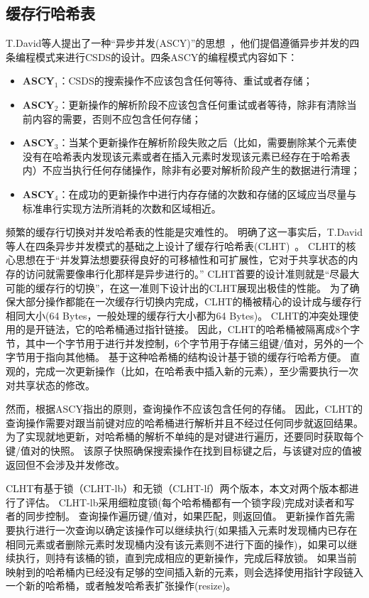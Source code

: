 \subsection{缓存行哈希表}
\label{sec:clht}

T.David等人提出了一种“异步并发(ASCY)”的思想~\cite{clht}，他们提倡遵循异步并发的四条编程模式来进行CSDS的设计。四条ASCY的编程模式内容如下：
\begin{itemize}
\item \textbf{ASCY$_1$}：CSDS的搜索操作不应该包含任何等待、重试或者存储；
\item \textbf{ASCY$_2$}：更新操作的解析阶段不应该包含任何重试或者等待，除非有清除当前内容的需要，否则不应包含任何存储；
\item \textbf{ASCY$_3$}：当某个更新操作在解析阶段失败之后（比如，需要删除某个元素使没有在哈希表内发现该元素或者在插入元素时发现该元素已经存在于哈希表内）不应当执行任何存储操作，除非有必要对解析阶段产生的数据进行清理；
\item \textbf{ASCY$_4$}：在成功的更新操作中进行内存存储的次数和存储的区域应当尽量与标准串行实现方法所消耗的次数和区域相近。
\end{itemize}

频繁的缓存行切换对并发哈希表的性能是灾难性的。
明确了这一事实后，T.David等人在四条异步并发模式的基础之上设计了缓存行哈希表(CLHT)~\cite{clht}。
CLHT的核心思想在于“并发算法想要获得良好的可移植性和可扩展性，它对于共享状态的内存的访问就需要像串行化那样是异步进行的。”
CLHT首要的设计准则就是“尽最大可能的缓存行的切换”，在这一准则下设计出的CLHT展现出极佳的性能。
为了确保大部分操作都能在一次缓存行切换内完成，CLHT的桶被精心的设计成与缓存行相同大小(64 Bytes，一般处理的缓存行大小都为64 Bytes)。
CLHT的冲突处理使用的是开链法，它的哈希桶通过指针链接。
因此，CLHT的哈希桶被隔离成8个字节，其中一个字节用于进行并发控制，6个字节用于存储三组键/值对，另外的一个字节用于指向其他桶。
基于这种哈希桶的结构设计基于锁的缓存行哈希方便。
直观的，完成一次更新操作（比如，在哈希表中插入新的元素），至少需要执行一次对共享状态的修改。

然而，根据ASCY指出的原则，查询操作不应该包含任何的存储。
因此，CLHT的查询操作需要对跟当前键对应的哈希桶进行解析并且不经过任何同步就返回结果。
为了实现就地更新，对哈希桶的解析不单纯的是对键进行遍历，还要同时获取每个键/值对的快照。
该原子快照确保搜索操作在找到目标键之后，与该键对应的值被返回但不会涉及并发修改。

CLHT有基于锁（CLHT-lb）和无锁（CLHT-lf）两个版本，本文对两个版本都进行了评估。
CLHT-lb采用细粒度锁(每个哈希桶都有一个锁字段)完成对读者和写者的同步控制。
查询操作遍历键/值对，如果匹配，则返回值。
更新操作首先需要执行进行一次查询以确定该操作可以继续执行(如果插入元素时发现桶内已存在相同元素或者删除元素时发现桶内没有该元素则不进行下面的操作)，如果可以继续执行，则持有该桶的锁，直到完成相应的更新操作，完成后释放锁。
如果当前映射到的哈希桶内已经没有足够的空间插入新的元素，则会选择使用指针字段链入一个新的哈希桶，或者触发哈希表扩张操作(resize)。

